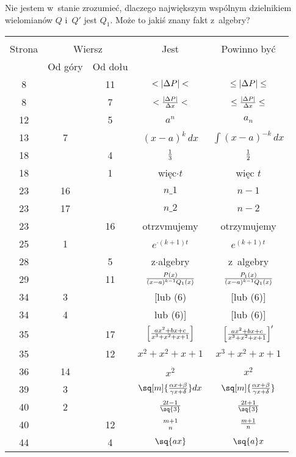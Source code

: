 \documentclass[a4paper,11pt]{article}
\begin{document}
\vspace{\spaceFour}


\start {} Nie jestem w~stanie zrozumieć, dlaczego największym
wspólnym dzielnikiem wielomianów $Q$ i~$Q'$ jest $Q_{ 1 }$. Może to
jakiś znany fakt z~algebry? \Dok

\begin{center}
  \begin{tabular}{|c|c|c|c|c|}
    \hline
    & \multicolumn{2}{c|}{} & & \\
    Strona & \multicolumn{2}{c|}{Wiersz}& Jest
                              & Powinno być \\ \cline{2-3}
    & Od góry & Od dołu &  &  \\ \hline
    8 & & 11 & $< | \Delta P | <$ & $\leq | \Delta P | \leq$ \\
    8 & & 7 & $< \frac{ | \Delta P | }{ \Delta x } <$
           & $\leq \frac{ | \Delta P | }{ \Delta x } \leq$ \\
    12 & & 5 & $a^{ n }$ & $a_{ n }$ \\
    13 & 7 & & $( x - a )^{ k }\, dx$ & $\int ( x - a )^{ -k }\, dx$ \\
    18 & & 4 & $\frac{ 1 }{ 3 }$ & $\frac{ 1 }{ 2 }$ \\
    18 & & 1 & więc$\cdot t$ & więc $t$ \\
    23 & 16 & & $n \_ 1$ & $n - 1$ \\
    23 & 17 & & $n \_ 2$ & $n - 2$ \\
    23 & & 16 & otrzvmujemy & otrzymujemy \\
    25 & 1 & & $e^{ \cdot (k + 1) t}$ & $e^{ (k + 1) t}$ \\
    28 & & 5 & z$\cdot$algebry & z~algebry \\
    29 & & 11 & $\frac{ P(x) }{ (x - a)^{k - 1} Q_{ 1 }(x) }$
           & $\frac{ P_{ 1 }(x) }{ (x - a)^{k - 1} Q_{ 1 }(x) }$ \\
    34 & 3 & & [lub (6) & [lub (6)] \\
    34 & 4 & & lub (6)] & [lub (6)] \\
    35 & & 17 & $\left[ \frac{ a x^{ 2 } + b x + c }
                { x^{ 3 } + x^{ 2 } + x + 1 } \right]$
           & $\left[ \frac{ a x^{ 2 } + b x + c }
             { x^{ 3 } + x^{ 2 } + x + 1 } \right]'$ \\
    35 & & 12 & $x^{ 2 } + x^{ 2 } + x + 1$
           & $x^{ 3 } + x^{ 2 } + x + 1$ \\
    36 & 14 & & $x^{ \dot{ 2 } }$ & $x^{ 2 }$ \\
    39 & 3 & & $\sq[ m ]{ \fr{ \al x + \be }{ \ga x + \del } } dx$
           & $\sq[ m ]{ \fr{ \al x + \be }{ \ga x + \del } }$ \\
    40 & 2 & & $\fr{ 2t - 1 }{ \sq{ 3 } }$ & $\fr{ 2t + 1 }{ \sq{ 3 } }$ \\
    40 & & 12 & ${ m + 1 \atop n }$ & $\frac{ m + 1 }{ n }$ \\
    44 & & 4 & $\sq{ ax }$ & $\sq{ a } x$ \\ \hline
  \end{tabular}


\end{center}
\end{document}

